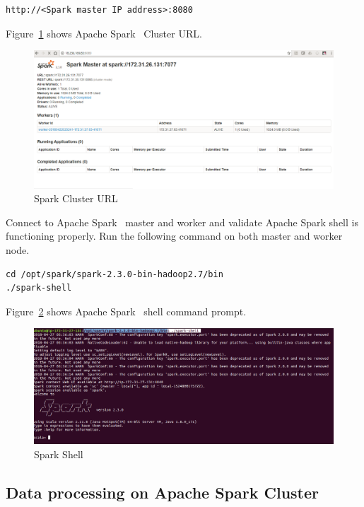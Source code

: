 \begin{verbatim}
http://<Spark master IP address>:8080
\end{verbatim}

Figure~\ref{f:spark-cluster-url} shows Apache
Spark~\cite{hid-sp18-511-www-spark} Cluster URL\@.

\begin{figure}[!ht]
\centering\includegraphics[width=\columnwidth]{images/sparkclusterurl.png}
\caption{Spark Cluster URL}\label{f:spark-cluster-url}
\end{figure}

Connect to Apache Spark~\cite{hid-sp18-511-www-spark} master and
worker and validate Apache Spark shell is functioning properly.  Run
the following command on both master and worker node.

\begin{verbatim}
cd /opt/spark/spark-2.3.0-bin-hadoop2.7/bin
./spark-shell 
\end{verbatim}
 
Figure~\ref{f:spark-shell} shows Apache
Spark~\cite{hid-sp18-511-www-spark} shell command prompt.

\begin{figure}[!ht]
	\centering\includegraphics[width=\columnwidth]{images/sparkshell.png}
	\caption{Spark Shell}\label{f:spark-shell}
\end{figure}

\subsection{Data processing on Apache Spark Cluster}

